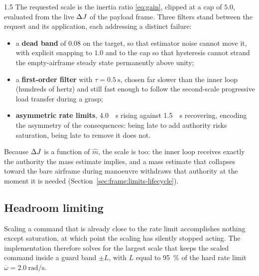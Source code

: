 \begin{spacing}{1.5}
The requested scale is the inertia ratio \eqref{eq:gain}, clipped at a cap of
$5.0$, evaluated from the live $\Delta J$ of the payload frame. Three filters stand
between the request and its application, each addressing a distinct failure:

\begin{itemize}
\item a \textbf{dead band} of $0.08$ on the target, so that estimator noise
cannot move it, with explicit snapping to $1.0$ and to the cap so that hysteresis
cannot strand the empty-airframe steady state permanently above unity;
\item a \textbf{first-order filter} with $\tau=\SI{0.5}{\second}$, chosen far
slower than the inner loop (hundreds of hertz) and still fast enough to follow the
second-scale progressive load transfer during a grasp;
\item \textbf{asymmetric rate limits}, \SI{4.0}{\per\second} rising against
\SI{1.5}{\per\second} recovering, encoding the asymmetry of the consequences:
being late to add authority risks saturation, being late to remove it does not.
\end{itemize}

Because $\Delta J$ is a function of $\hat m$, the scale is too: the inner loop
receives exactly the authority the mass estimate implies, and a mass estimate
that collapses toward the bare airframe during manoeuvre withdraws that authority
at the moment it is needed (Section~\ref{sec:frame:limits-lifecycle}).

\subsection{Headroom limiting}\label{sec:frame:headroom}

Scaling a command that is already close to the rate limit accomplishes nothing
except saturation, at which point the scaling has silently stopped acting. The
implementation therefore solves for the largest scale that keeps the scaled
command inside a guard band $\pm L$, with $L$ equal to \SI{95}{\percent} of the
hard rate limit $\overline{\omega}=\SI{2.0}{\radian\per\second}$.


\end{spacing}
